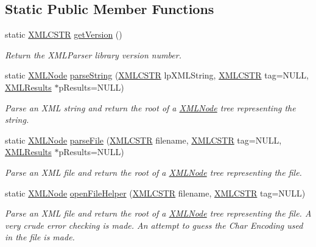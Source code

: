 \subsection*{Static Public Member Functions}
\begin{DoxyCompactItemize}
\item 
static \hyperlink{xmlParser_8h_acdb0d6fd8dd596384b438d86cfb2b182}{X\-M\-L\-C\-S\-T\-R} \hyperlink{structXMLNode_a288584f591421a189727d19cdc9fc430}{get\-Version} ()
\begin{DoxyCompactList}\small\item\em Return the X\-M\-L\-Parser library version number. \end{DoxyCompactList}\item 
static \hyperlink{structXMLNode}{X\-M\-L\-Node} \hyperlink{group__conversions_ga72125a4ccfae9b39bafab768346bbc7e}{parse\-String} (\hyperlink{xmlParser_8h_acdb0d6fd8dd596384b438d86cfb2b182}{X\-M\-L\-C\-S\-T\-R} lp\-X\-M\-L\-String, \hyperlink{xmlParser_8h_acdb0d6fd8dd596384b438d86cfb2b182}{X\-M\-L\-C\-S\-T\-R} tag=N\-U\-L\-L, \hyperlink{structXMLResults}{X\-M\-L\-Results} $\ast$p\-Results=N\-U\-L\-L)
\begin{DoxyCompactList}\small\item\em Parse an X\-M\-L string and return the root of a \hyperlink{structXMLNode}{X\-M\-L\-Node} tree representing the string. \end{DoxyCompactList}\item 
static \hyperlink{structXMLNode}{X\-M\-L\-Node} \hyperlink{group__conversions_gae984d7ebce97fad429b2b786439815fb}{parse\-File} (\hyperlink{xmlParser_8h_acdb0d6fd8dd596384b438d86cfb2b182}{X\-M\-L\-C\-S\-T\-R} filename, \hyperlink{xmlParser_8h_acdb0d6fd8dd596384b438d86cfb2b182}{X\-M\-L\-C\-S\-T\-R} tag=N\-U\-L\-L, \hyperlink{structXMLResults}{X\-M\-L\-Results} $\ast$p\-Results=N\-U\-L\-L)
\begin{DoxyCompactList}\small\item\em Parse an X\-M\-L file and return the root of a \hyperlink{structXMLNode}{X\-M\-L\-Node} tree representing the file. \end{DoxyCompactList}\item 
static \hyperlink{structXMLNode}{X\-M\-L\-Node} \hyperlink{group__conversions_ga46f99cf406604471e15d4378f74ecc63}{open\-File\-Helper} (\hyperlink{xmlParser_8h_acdb0d6fd8dd596384b438d86cfb2b182}{X\-M\-L\-C\-S\-T\-R} filename, \hyperlink{xmlParser_8h_acdb0d6fd8dd596384b438d86cfb2b182}{X\-M\-L\-C\-S\-T\-R} tag=N\-U\-L\-L)
\begin{DoxyCompactList}\small\item\em Parse an X\-M\-L file and return the root of a \hyperlink{structXMLNode}{X\-M\-L\-Node} tree representing the file. A very crude error checking is made. An attempt to guess the Char Encoding used in the file is made. \end{DoxyCompactList}\item 

\end{DoxyCompactItemize}
